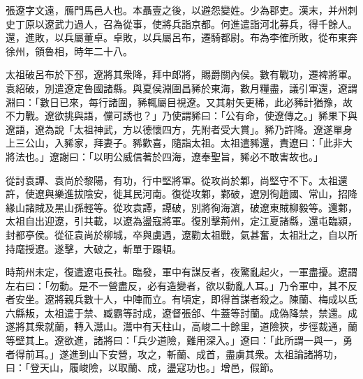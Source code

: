 \begin{pinyinscope}
 
 
 張遼字文遠，鴈門馬邑人也。本聶壹之後，以避怨變姓。少為郡吏。漢末，并州刺史丁原以遼武力過人，召為從事，使將兵詣京都。何進遣詣河北募兵，得千餘人。還，進敗，以兵屬董卓。卓敗，以兵屬呂布，遷騎都尉。布為李傕所敗，從布東奔徐州，領魯相，時年二十八。
 
 
 
 
 太祖破呂布於下邳，遼將其衆降，拜中郎將，賜爵關內侯。數有戰功，遷裨將軍。袁紹破，別遣遼定魯國諸縣。與夏侯淵圍昌豨於東海，數月糧盡，議引軍還，遼謂淵曰：「數日已來，每行諸圍，豨輒屬目視遼。又其射矢更稀，此必豨計猶豫，故不力戰。遼欲挑與語，儻可誘也？」乃使謂豨曰：「公有命，使遼傳之。」豨果下與遼語，遼為說「太祖神武，方以德懷四方，先附者受大賞」。豨乃許降。遼遂單身上三公山，入豨家，拜妻子。豨歡喜，隨詣太祖。太祖遣豨還，責遼曰：「此非大將法也。」遼謝曰：「以明公威信著於四海，遼奉聖旨，豨必不敢害故也。」
 
 
 
 
 從討袁譚、袁尚於黎陽，有功，行中堅將軍。從攻尚於鄴，尚堅守不下。太祖還許，使遼與樂進拔陰安，徙其民河南。復從攻鄴，鄴破，遼別徇趙國、常山，招降緣山諸賊及黑山孫輕等。從攻袁譚，譚破，別將徇海濵，破遼東賊柳毅等。還鄴，太祖自出迎遼，引共載，以遼為盪寇將軍。復別擊荊州，定江夏諸縣，還屯臨潁，封都亭侯。從征袁尚於柳城，卒與虜遇，遼勸太祖戰，氣甚奮，太祖壯之，自以所持麾授遼。遂擊，大破之，斬單于蹋頓。
 
 
 
 
 
 
 時荊州未定，復遣遼屯長社。臨發，軍中有謀反者，夜驚亂起火，一軍盡擾。遼謂左右曰：「勿動。是不一營盡反，必有造變者，欲以動亂人耳。」乃令軍中，其不反者安坐。遼將親兵數十人，中陣而立。有頃定，即得首謀者殺之。陳蘭、梅成以氐六縣叛，太祖遣于禁、臧霸等討成，遼督張郃、牛蓋等討蘭。成偽降禁，禁還。成遂將其衆就蘭，轉入灊山。灊中有天柱山，高峻二十餘里，道險狹，步徑裁通，蘭等壁其上。遼欲進，諸將曰：「兵少道險，難用深入。」遼曰：「此所謂一與一，勇者得前耳。」遂進到山下安營，攻之，斬蘭、成首，盡虜其衆。太祖論諸將功，曰：「登天山，履峻險，以取蘭、成，盪寇功也。」增邑，假節。
 

\end{pinyinscope}
